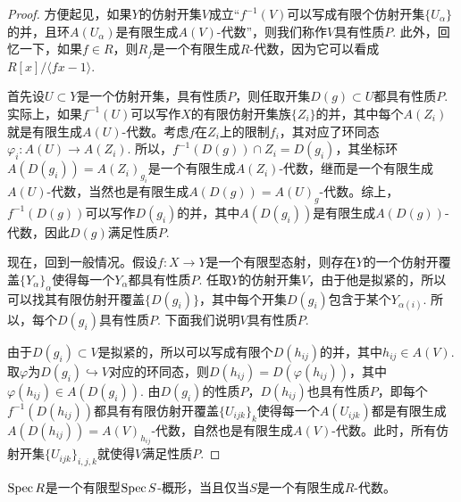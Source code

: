 \begin{proof}
	方便起见，如果$Y$的仿射开集$V$成立“$f^{-1}(V)$可以写成有限个仿射开集$\{U_{\alpha}\}$的并，且环$A(U_{\alpha})$是有限生成$A(V)$-代数”，则我们称作$V$具有性质$P$. 此外，回忆一下，如果$f\in R$，则$R_{f}$是一个有限生成$R$-代数，因为它可以看成$R[x]/\langle fx-1\rangle$.

	首先设$U\subset Y$是一个仿射开集，具有性质$P$，则任取开集$D(g)\subset U$都具有性质$P$. 实际上，如果$f^{-1}(U)$可以写作$X$的有限仿射开集族$\{Z_i\}$的并，其中每个$A(Z_i)$就是有限生成$A(U)$-代数。考虑$f$在$Z_i$上的限制$f_i$，其对应了环同态$\varphi_i:A(U)\to A(Z_i)$. 所以，$f^{-1}(D(g))\cap Z_i=D(g_i)$，其坐标环$A(D(g_i))=A(Z_i)_{g_i}$是一个有限生成$A(Z_i)$-代数，继而是一个有限生成$A(U)$-代数，当然也是有限生成$A(D(g))=A(U)_g$-代数。综上，$f^{-1}(D(g))$可以写作$D(g_i)$的并，其中$A(D(g_i))$是有限生成$A(D(g))$-代数，因此$D(g)$满足性质$P$.

	现在，回到一般情况。假设$f:X\to Y$是一个有限型态射，则存在$Y$的一个仿射开覆盖$\{Y_\alpha\}_\alpha$使得每一个$Y_\alpha$都具有性质$P$. 任取$Y$的仿射开集$V$，由于他是拟紧的，所以可以找其有限仿射开覆盖$\{D(g_i)\}$，其中每个开集$D(g_i)$包含于某个$Y_{\alpha(i)}$. 所以，每个$D(g_i)$具有性质$P$. 下面我们说明$V$具有性质$P$.
	
	由于$D(g_i)\subset V$是拟紧的，所以可以写成有限个$D(h_{ij})$的并，其中$h_{ij}\in A(V)$. 取$\varphi$为$D(g_i)\hookrightarrow V$对应的环同态，则$D(h_{ij})=D(\varphi(h_{ij}))$，其中$\varphi(h_{ij})\in A(D(g_i))$. 由$D(g_i)$的性质$P$，$D(h_{ij})$也具有性质$P$，即每个$f^{-1}(D(h_{ij}))$都具有有限仿射开覆盖$\{U_{ijk}\}_k$使得每一个$A(U_{ijk})$都是有限生成$A(D(h_{ij}))=A(V)_{h_{ij}}$-代数，自然也是有限生成$A(V)$-代数。此时，所有仿射开集$\{U_{ijk}\}_{i,j,k}$就使得$V$满足性质$P$.
\end{proof}

\begin{lem}
	$\operatorname{Spec} R$是一个有限型$\operatorname{Spec} S$-概形，当且仅当$S$是一个有限生成$R$-代数。
\end{lem}